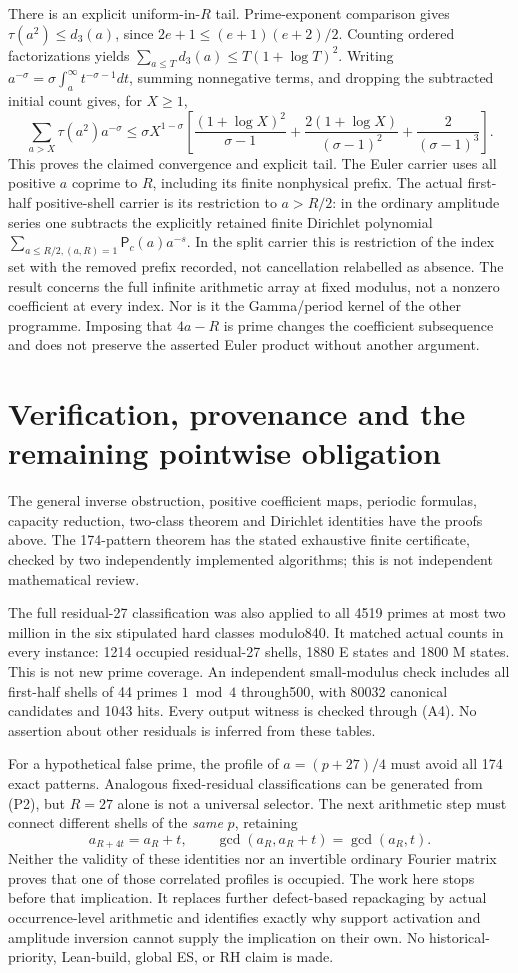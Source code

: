 There is an explicit uniform-in-$R$ tail. Prime-exponent comparison gives
$\tau(a^2)\le d_3(a)$, since $2e+1\le(e+1)(e+2)/2$.
Counting ordered factorizations yields
$\sum_{a\le T}d_3(a)\le T(1+\log T)^2$.
Writing $a^{-\sigma}=\sigma\int_a^\infty t^{-\sigma-1}dt$, summing
nonnegative terms, and dropping the subtracted initial count gives, for $X\ge1$,
\[
 \boxed{
 \sum_{a>X}\tau(a^2)a^{-\sigma}
 \le \sigma X^{1-\sigma}
 \left[\frac{(1+\log X)^2}{\sigma-1}
 +\frac{2(1+\log X)}{(\sigma-1)^2}
 +\frac2{(\sigma-1)^3}\right].}
 \tag{D3}
\]
This proves the claimed convergence and explicit tail. The Euler carrier
uses all positive $a$ coprime to $R$, including its finite nonphysical prefix.
The actual first-half positive-shell carrier is its restriction to $a>R/2$:
in the ordinary amplitude series one subtracts the explicitly retained finite
Dirichlet polynomial $\sum_{a\le R/2,(a,R)=1}\mathsf P_c(a)a^{-s}$.
In the split carrier this is restriction of the index set with the removed
prefix recorded, not cancellation relabelled as absence. The result concerns
the full infinite arithmetic array at fixed modulus, not a nonzero coefficient
at every index. Nor is it the Gamma/period kernel of the other programme.
Imposing that $4a-R$ is prime changes the coefficient subsequence and does
not preserve the asserted Euler product without another argument.

\section{Verification, provenance and the remaining pointwise obligation}
The general inverse obstruction, positive coefficient maps, periodic formulas,
capacity reduction, two-class theorem and Dirichlet identities have the proofs
above. The 174-pattern theorem has the stated exhaustive finite certificate,
checked by two independently implemented algorithms; this is not independent
mathematical review.

The full residual-27 classification was also applied to all 4519 primes at
most two million in the six stipulated hard classes modulo840. It matched
actual counts in every instance: 1214 occupied residual-27 shells, 1880 E
states and 1800 M states. This is not new prime coverage. An independent
small-modulus check includes all first-half shells of 44 primes $1\bmod4$
through500, with 80032 canonical candidates and 1043 hits. Every output
witness is checked through (A4). No assertion about other residuals is
inferred from these tables.

For a hypothetical false prime, the profile of $a=(p+27)/4$ must avoid all
174 exact patterns. Analogous fixed-residual classifications can be generated
from (P2), but $R=27$ alone is not a universal selector. The next arithmetic
step must connect different shells of the \emph{same} $p$, retaining
\[
 a_{R+4t}=a_R+t,\qquad \gcd(a_R,a_R+t)=\gcd(a_R,t).
\]
Neither the validity of these identities nor an invertible ordinary Fourier
matrix proves that one of those correlated profiles is occupied. The work
here stops before that implication. It replaces further defect-based
repackaging by actual occurrence-level arithmetic and identifies exactly why
support activation and amplitude inversion cannot supply the implication on
their own. No historical-priority, Lean-build, global ES, or RH claim is made.
